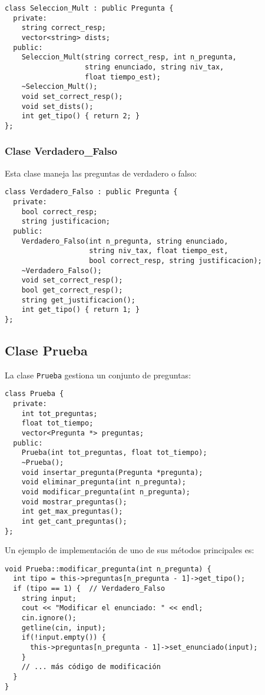 \documentclass[12pt]{article}
\begin{document}
\begin{lstlisting}[style=customc]
class Seleccion_Mult : public Pregunta {  
  private:
    string correct_resp;
    vector<string> dists;
  public:
    Seleccion_Mult(string correct_resp, int n_pregunta, 
                   string enunciado, string niv_tax, 
                   float tiempo_est);
    ~Seleccion_Mult();
    void set_correct_resp();
    void set_dists();
    int get_tipo() { return 2; }
};
\end{lstlisting}

\subsubsection{Clase Verdadero\_Falso}
Esta clase maneja las preguntas de verdadero o falso:

\begin{lstlisting}[style=customc]
class Verdadero_Falso : public Pregunta {
  private:
    bool correct_resp;
    string justificacion;
  public:
    Verdadero_Falso(int n_pregunta, string enunciado, 
                    string niv_tax, float tiempo_est,
                    bool correct_resp, string justificacion);
    ~Verdadero_Falso();
    void set_correct_resp();
    bool get_correct_resp();
    string get_justificacion();
    int get_tipo() { return 1; }
};
\end{lstlisting}

\subsection{Clase Prueba}
La clase \texttt{Prueba} gestiona un conjunto de preguntas:

\begin{lstlisting}[style=customc]
class Prueba {
  private:
    int tot_preguntas;
    float tot_tiempo;
    vector<Pregunta *> preguntas;
  public:
    Prueba(int tot_preguntas, float tot_tiempo);
    ~Prueba();
    void insertar_pregunta(Pregunta *pregunta);
    void eliminar_pregunta(int n_pregunta);
    void modificar_pregunta(int n_pregunta);
    void mostrar_preguntas();
    int get_max_preguntas();
    int get_cant_preguntas();
};
\end{lstlisting}

Un ejemplo de implementaci\'on de uno de sus m\'etodos principales es:

\begin{lstlisting}[style=customc]
void Prueba::modificar_pregunta(int n_pregunta) {
  int tipo = this->preguntas[n_pregunta - 1]->get_tipo();
  if (tipo == 1) {  // Verdadero_Falso
    string input;
    cout << "Modificar el enunciado: " << endl;
    cin.ignore();
    getline(cin, input);
    if(!input.empty()) {
      this->preguntas[n_pregunta - 1]->set_enunciado(input);
    }
    // ... más código de modificación
  }
}
\end{lstlisting}
\end{document}
